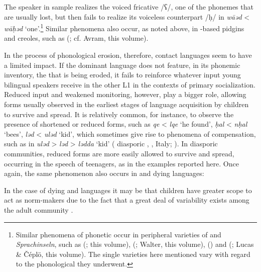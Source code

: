 \documentclass[output=paper]{langsci/langscibook}
\begin{document}
The speaker in sample   realizes the voiced  fricative /ʕ/, one of the phonemes that are usually lost, but then fails to realize its voiceless counterpart /ḥ/ in \textit{wāəd} < \textit{wāḥəd} ‘one’.\footnote{Similar phenomena of phonetic  occur in peripheral varieties of  and \textit{Sprachinseln}, such as   (\citealt[19--20]{Owens1993}; this volume),   (\citealt{Borg1985}; Walter, this volume),    (\citealt{Seeger2013article}) and  (\citealt[299]{BorgAzzopardi-Alexander1997}; Lucas \& Čéplö, this volume). The single varieties here mentioned vary with regard to the phonological  they underwent.} Similar phenomena also occur, as noted above, in -based pidgins and creoles, such as   (\citealt[17, 21]{Manfredi2017}; cf. Avram, this volume). 

In the process of phonological erosion, therefore, contact languages seem to have a limited impact. If the dominant language does not feature, in its phonemic inventory, the  that is being eroded, it fails to reinforce whatever input young bilingual speakers receive in the other L1 in the contexts of primary socialization. Reduced input and weakened monitoring, however, play a bigger role, allowing forms usually observed in the earliest stages of language acquisition by  children to survive and spread. It is relatively common, for instance, to observe the presence of shortened or reduced forms, such as \textit{qe} < \textit{lqe} ‘he found’, \textit{ḥal} < \textit{nḥal} ‘bees’, \textit{ləd} < \textit{uləd} ‘kid’, which sometimes give rise to phenomena of compensation, such as in \textit{uləd} > \textit{ləd} > \textit{lədda} ‘kid’ ( diasporic , , Italy; \citealt[85]{Danna2017book}). In diasporic communities, reduced forms are more easily allowed to survive and spread, occurring in the speech of teenagers, as in the examples reported here. Once again, the same phenomenon also occurs in  and dying languages: 

In the case of dying and  languages it may be that children have greater scope to act as norm-makers due to the fact that a great deal of variability exists among the adult community \citep[372–373]{Romaine1989}.
\end{document}
